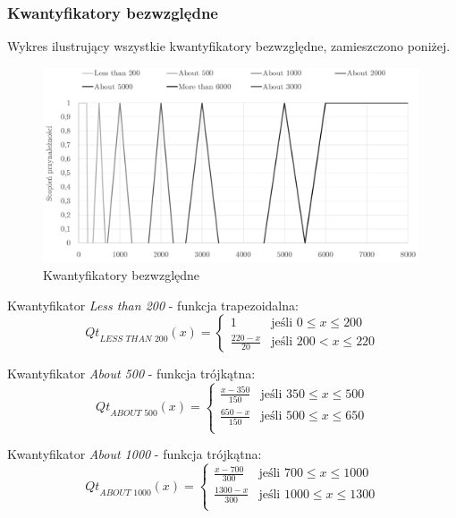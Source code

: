 \documentclass{classrep}
\begin{document}
\subsubsection{Kwantyfikatory bezwzględne}
Wykres ilustrujący wszystkie kwantyfikatory bezwzględne, zamieszczono poniżej.
\begin{figure}[H]
	\centering
	\includegraphics[width=0.99\textwidth]{Pictures/TermsCharts/absolute.png}
	\caption{Kwantyfikatory bezwzględne}
\end{figure}

Kwantyfikator \textit{Less than 200} - funkcja trapezoidalna:
\begin{equation}
{Qt}_{\textit{LESS THAN 200}}(x)= \left\{ \begin{array}{ll}
1 			& \textrm{jeśli $0 \leq x \leq 200$} \\
\frac{220-x}{20} 	& \textrm{jeśli $200 < x \leq 220$}
\end{array} \right.
\end{equation}

Kwantyfikator \textit{About 500} - funkcja trójkątna:
\begin{equation}
{Qt}_{\textit{ABOUT 500}}(x)= \left\{ \begin{array}{ll}
\frac{x-350}{150} 	 & \textrm{jeśli $350 \leq x \leq 500$} \\
\frac{650-x}{150} 	 & \textrm{jeśli $500 \leq x \leq 650$} \\
\end{array} \right.
\end{equation}

Kwantyfikator \textit{About 1000} - funkcja trójkątna:
\begin{equation}
{Qt}_{\textit{ABOUT 1000}}(x)= \left\{ \begin{array}{ll}
\frac{x-700}{300} 	 & \textrm{jeśli $700 \leq x \leq 1000$} \\
\frac{1300-x}{300} 	 & \textrm{jeśli $1000 \leq x \leq 1300$} \\
\end{array} \right.
\end{equation}
\end{document}

